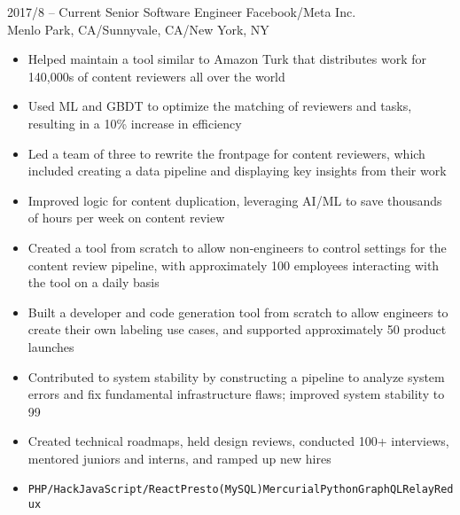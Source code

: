 \documentclass[9pt]{developercv} %
\begin{document}
\vspace{0.5cm}






\begin{entrylist}
	\entry
		{2017/8 -- Current}
		{Senior Software Engineer}
		{Facebook/Meta Inc.\\\footnotesize{Menlo Park, CA/Sunnyvale, CA/New York, NY}} 
		{
			\begin{itemize}[leftmargin=-0.0125in]
				\item Helped maintain a tool similar to Amazon Turk that distributes work for 140,000s of content reviewers all over the world
				\item Used ML and GBDT to optimize the matching of reviewers and tasks, resulting in a 10\% increase in efficiency 
				\item Led a team of three to rewrite the frontpage for content reviewers, which included creating a data pipeline and displaying key insights from their work
				\item Improved logic for content duplication, leveraging AI/ML to save thousands of hours per week on content review
				\item Created a tool from scratch to allow non-engineers to control settings for the content review pipeline, with approximately 100 employees interacting with the tool on a daily basis
				\item Built a developer and code generation tool from scratch to allow engineers to create their own labeling use cases, and supported approximately 50 product launches
				\item Contributed to system stability by constructing a pipeline to analyze system errors and fix fundamental infrastructure flaws; improved system stability to 99%
				\item Created technical roadmaps, held design reviews, conducted 100+ interviews, mentored juniors and interns, and ramped up new hires
				\item \texttt{PHP/Hack}\slashsep\texttt{JavaScript/React}\slashsep\texttt{Presto(MySQL)}\slashsep\texttt{Mercurial}\slashsep\texttt{Python}\slashsep\texttt{GraphQL}\slashsep\texttt{Relay}\slashsep\texttt{Redux}

\end{itemize}}
\end{entrylist}
\end{document}
